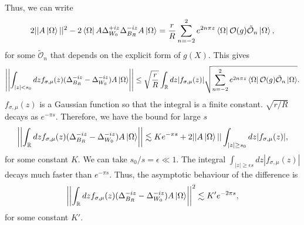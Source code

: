 \documentclass[a4paper,11pt]{article}
\theoremstyle{definition}
\begin{document}
Thus, we can write 
\begin{align}
    2||A\ket{\Omega}||^2 - 2\bra{\Omega}A \Delta_{W_0}^{+iz}\Delta_{B_R}^{-iz} A\ket{\Omega} = \frac{r}{R} \sum_{n=-2}^2e^{2n\pi z} \bra{\Omega} \mathcal{O}(g) \tilde{\mathcal{O}}_n\ket{\Omega},
\end{align}
for some $\tilde{\mathcal{O}}_n$ that depends on the explicit form of $g(X)$. This gives 
\begin{align}
    \left|\left|\int_{|z|<s_0} dz f_{\sigma,\mu}(z) (\Delta_{B_R}^{-iz} - \Delta_{W_0}^{-iz})A\ket{\Omega}\right|\right| 
    \leq \sqrt{\frac{r}{R}}\int_{\mathbb{R}} dz |f_{\sigma,\mu}(z)| \sqrt{ \sum_{n=-2}^2e^{2n\pi z} \bra{\Omega} \mathcal{O}(g) \tilde{\mathcal{O}}_n\ket{\Omega}}.
\end{align}
$f_{\sigma,\mu}(z)$ is a Gaussian function so that the integral is a finite constant. $\sqrt{r/R}$ decays as $e^{-\pi s}$. Therefore, we have the bound for large $s$
\begin{align}
    \left|\left|\int_\mathbb{R} dz f_{\sigma,\mu}(z)(\Delta_{B_R}^{-iz} - \Delta_{W_0}^{-iz})A\ket{\Omega}\right|\right| \lesssim  Ke^{-\pi s} + 2||A\ket{\Omega}|| \int_{|z|\geq s_0} dz |f_{\sigma,\mu}(z)|,
\end{align}
for some constant $K$. We can take $s_0/s = \epsilon\ll 1$. The integral $\int_{|z|\geq \epsilon s} dz |f_{\sigma,\mu}(z)|$ decays much faster than $e^{-\pi s}$. Thus, the asymptotic behaviour of the difference is
\begin{align}
    \left|\left|\int_\mathbb{R} dz f_{\sigma,\mu}(z)(\Delta_{B_R}^{-iz} - \Delta_{W_0}^{-iz})A\ket{\Omega}\right|\right|^2 \lesssim  K'e^{-2\pi s},
\end{align}
for some constant $K'$.
\end{document}
